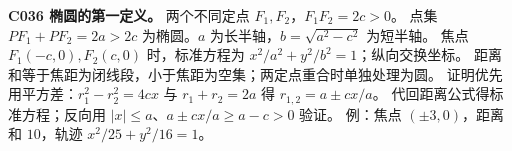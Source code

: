 \textbf{C036 椭圆的第一定义。} 两个不同定点 $F_1,F_2$，$F_1F_2=2c>0$。
点集 $PF_1+PF_2=2a>2c$ 为椭圆。$a$ 为长半轴，$b=\sqrt{a^2-c^2}$ 为短半轴。
焦点 $F_1(-c,0),F_2(c,0)$ 时，标准方程为 $x^2/a^2+y^2/b^2=1$；纵向交换坐标。
距离和等于焦距为闭线段，小于焦距为空集；两定点重合时单独处理为圆。
证明优先用平方差：$r_1^2-r_2^2=4cx$ 与 $r_1+r_2=2a$ 得 $r_{1,2}=a\pm cx/a$。
代回距离公式得标准方程；反向用 $|x|\le a$、$a\pm cx/a\ge a-c>0$ 验证。
例：焦点 $(\pm3,0)$，距离和 $10$，轨迹 $x^2/25+y^2/16=1$。
